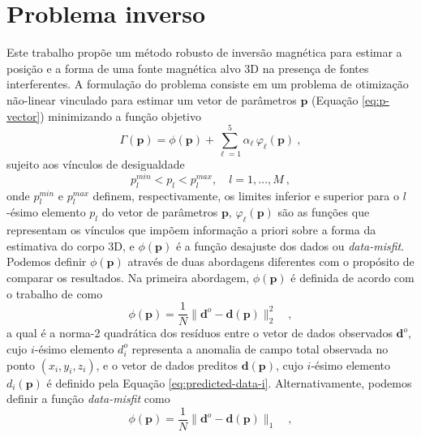 \section{Problema inverso}

Este trabalho propõe um método robusto de inversão magnética para estimar a posição e a forma de uma fonte magnética alvo 3D na presença de fontes interferentes.
A formulação do problema consiste em um problema de otimização não-linear vinculado para estimar um vetor de parâmetros $\mathbf{p}$ (Equação \ref{eq:p-vector}) minimizando a função objetivo
\begin{equation}
\Gamma (\mathbf{p}) = \phi (\mathbf{p}) + \sum\limits^{5}_{\ell =1} \alpha_{\ell} \, \varphi_{\ell}(\mathbf{p}) \: ,
\label{eq:gamma}
\end{equation}
sujeito aos vínculos de desigualdade
\begin{equation}
p_{l}^{min} < p_{l} < p_{l}^{max}, \quad l = 1, \dots, M \: ,
\label{eq:inequality-constraints}
\end{equation}
onde $p_{l}^{min}$ e $p_{l}^{max}$ definem, respectivamente, os limites inferior e superior para o $l$-ésimo elemento $p_{l}$ do vetor de parâmetros $\mathbf{p}$,
$\varphi_{\ell}(\mathbf{p})$ são as funções que representam os vínculos que impõem informação a priori sobre a forma da estimativa do corpo 3D, e $\phi (\mathbf{p})$ 
é a função desajuste dos dados ou \textit{data-misfit}.
Podemos definir $\phi (\mathbf{p})$ através de duas abordagens diferentes com o propósito de comparar os resultados. Na primeira abordagem, $\phi (\mathbf{p})$ é definida de acordo com o trabalho de \citet{vital_etal2019} como
\begin{equation}\label{eq:L2_misfit}
\phi (\mathbf{p}) = \frac{1}{N} 
\| \mathbf{d}^{o} - \mathbf{d}(\mathbf{p}) \|_{2}^{2} \quad ,
\end{equation}
a qual é a norma-2 quadrática \citep[e.g.,][p. 331]{aster_etal2019} dos resíduos entre o vetor de dados observados $\mathbf{d}^{o}$, cujo $i$-ésimo elemento $d_{i}^{o}$ representa a anomalia de campo total observada no ponto $(x_{i}, y_{i}, z_{i})$, e o vetor de dados preditos $\mathbf{d}(\mathbf{p})$, cujo $i$-ésimo elemento $d_{i} (\mathbf{p})$ é definido pela Equação \ref{eq:predicted-data-i}.
Alternativamente, podemos definir a função \textit{data-misfit} como
\begin{equation}\label{eq:L1_misfit}
\phi (\mathbf{p}) = \frac{1}{N} 
\| \mathbf{d}^{o} - \mathbf{d}(\mathbf{p}) \|_{1} \quad ,
\end{equation}
